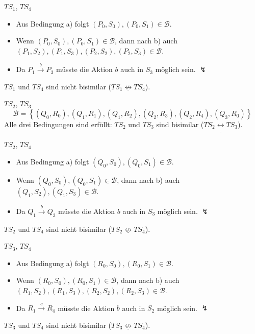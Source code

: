 \documentclass[a4paper]{scrartcl}
\begin{document}
\begin{description}
    \item $TS_1$, $TS_4$
        \begin{itemize}
            \item Aus Bedingung a) folgt $(P_0,S_0), (P_0,S_1) \in \mathcal{B}$.
            \item Wenn $(P_0,S_0), (P_0,S_1) \in \mathcal{B}$, dann nach b) auch
                \\ $(P_1,S_2), (P_1,S_3), (P_2,S_2), (P_2,S_3) \in \mathcal{B}$.
            \item Da $P_1 \stackrel{b}{\rightarrow} P_3$ müsste die Aktion $b$
                auch in $S_3$ möglich sein. $\lightning$
        \end{itemize}
        $TS_1$ und $TS_4$ sind nicht bisimilar
        ($TS_1  \underline{\not\leftrightarrow} TS_4$).

    \item $TS_2$, $TS_3$
        \begin{equation*}
            \mathcal{B} = \left\{ (Q_0,R_0), (Q_1,R_1), (Q_1,R_2), (Q_2,R_3), (Q_2,R_4), (Q_3,R_0) \right\}
        \end{equation*}
        Alle drei Bedingungen sind erfüllt: $TS_2$ und $TS_3$ sind bisimilar
        ($TS_2  \underline{\leftrightarrow} TS_3$).

    \item $TS_2$, $TS_4$
        \begin{itemize}
            \item Aus Bedingung a) folgt $(Q_0,S_0), (Q_0,S_1) \in \mathcal{B}$.
            \item Wenn $(Q_0,S_0), (Q_0,S_1) \in \mathcal{B}$, dann nach b) auch
                $(Q_1,S_2), (Q_1,S_3) \in \mathcal{B}$.
            \item Da $Q_1 \stackrel{b}{\rightarrow} Q_3$ müsste die Aktion $b$
                auch in $S_3$ möglich sein. $\lightning$
        \end{itemize}
        $TS_2$ und $TS_4$ sind nicht bisimilar
        ($TS_2  \underline{\not\leftrightarrow} TS_4$).

    \item $TS_3$, $TS_4$
        \begin{itemize}
            \item Aus Bedingung a) folgt $(R_0,S_0), (R_0,S_1) \in \mathcal{B}$.
            \item Wenn $(R_0,S_0), (R_0,S_1) \in \mathcal{B}$, dann nach b) auch
                \\ $(R_1,S_2), (R_1,S_3), (R_2,S_2), (R_2,S_3) \in \mathcal{B}$.
            \item Da $R_1 \stackrel{c}{\rightarrow} R_4$ müsste die Aktion $b$
                auch in $S_2$ möglich sein. $\lightning$
        \end{itemize}
        $TS_3$ und $TS_4$ sind nicht bisimilar
        ($TS_3  \underline{\not\leftrightarrow} TS_4$).


\end{description}
\end{document}
